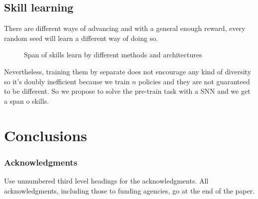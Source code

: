 \documentclass{article} %
\begin{document}
\subsection{Skill learning}

There are different ways of advancing and with a general enough reward, every random seed will learn a different way of doing so.

\begin{figure}[h]
	\centering
	\caption{Span of skills learn by different methods and architectures}
	\label{fig:MI_reward}
\end{figure}

Nevertheless, training them by separate does not encourage any kind of diversity so it's doubly inefficient because we train $n$ policies and they are not guaranteed to be different. So we propose to solve the pre-train task with a SNN and we get a span o skills.

\section{Conclusions}

\subsubsection*{Acknowledgments}

Use unnumbered third level headings for the acknowledgments. All
acknowledgments, including those to funding agencies, go at the end of the paper.



\end{document}
